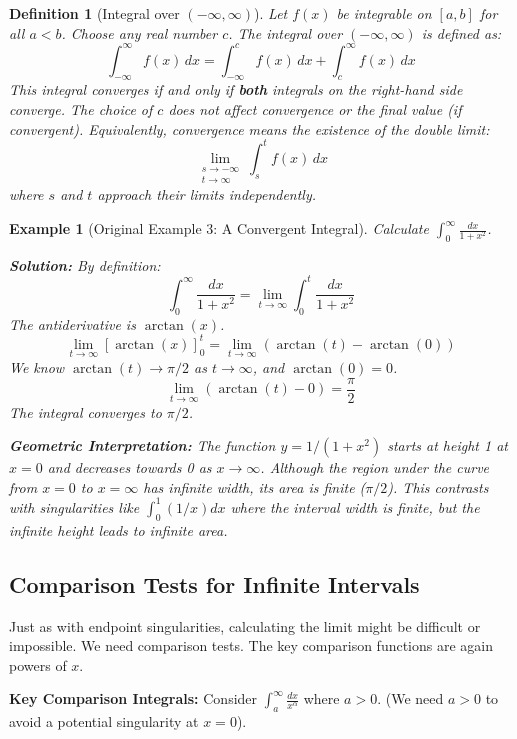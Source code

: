 \documentclass[11pt]{article}
\theoremstyle{mytheoremstyle}
\theoremstyle{mydefinitionstyle}
\newtheorem{definition}[theorem]{Definition}
\newtheorem{example}[theorem]{Example}
\begin{document}
\begin{definition}[\texorpdfstring{Integral over $(-\infty, \infty)$}{Integral over (-inf, inf)}]
Let $f(x)$ be integrable on $[a, b]$ for all $a < b$. Choose any real number $c$. The integral over $(-\infty, \infty)$ is defined as:
\[ \int_{-\infty}^\infty f(x) \, dx = \int_{-\infty}^c f(x) \, dx + \int_c^\infty f(x) \, dx \]
This integral converges if and only if \textbf{both} integrals on the right-hand side converge. The choice of $c$ does not affect convergence or the final value (if convergent).
Equivalently, convergence means the existence of the double limit:
\[ \lim_{\substack{s \to -\infty \\ t \to \infty}} \int_s^t f(x) \, dx \]
where $s$ and $t$ approach their limits independently.
\end{definition}

\begin{example}[Original Example 3: A Convergent Integral]
Calculate $\int_0^\infty \frac{dx}{1+x^2}$.

\textbf{Solution:}
By definition:
\[ \int_0^\infty \frac{dx}{1+x^2} = \lim_{t \to \infty} \int_0^t \frac{dx}{1+x^2} \]
The antiderivative is $\arctan(x)$.
\[ \lim_{t \to \infty} [\arctan(x)]_0^t = \lim_{t \to \infty} (\arctan(t) - \arctan(0)) \]
We know $\arctan(t) \to \pi/2$ as $t \to \infty$, and $\arctan(0) = 0$.
\[ \lim_{t \to \infty} (\arctan(t) - 0) = \frac{\pi}{2} \]
The integral converges to $\pi/2$.

\textbf{Geometric Interpretation:} The function $y = 1/(1+x^2)$ starts at height 1 at $x=0$ and decreases towards 0 as $x \to \infty$. Although the region under the curve from $x=0$ to $x=\infty$ has infinite width, its area is finite ($\pi/2$). This contrasts with singularities like $\int_0^1 (1/x) dx$ where the interval width is finite, but the infinite height leads to infinite area.
\end{example}

\subsection{Comparison Tests for Infinite Intervals}

Just as with endpoint singularities, calculating the limit might be difficult or impossible. We need comparison tests. The key comparison functions are again powers of $x$.

\textbf{Key Comparison Integrals:} Consider $\int_a^\infty \frac{dx}{x^\alpha}$ where $a > 0$. (We need $a>0$ to avoid a potential singularity at $x=0$).
\end{document}
